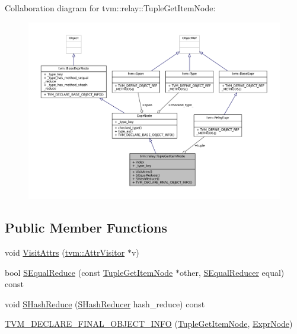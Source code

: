 Collaboration diagram for tvm\+:\+:relay\+:\+:Tuple\+Get\+Item\+Node\+:
\nopagebreak
\begin{figure}[H]
\begin{center}
\leavevmode
\includegraphics[width=350pt]{classtvm_1_1relay_1_1TupleGetItemNode__coll__graph}
\end{center}
\end{figure}
\subsection*{Public Member Functions}
\begin{DoxyCompactItemize}
\item 
void \hyperlink{classtvm_1_1relay_1_1TupleGetItemNode_afd099ce2c3f60fe39b4fe4094c77c58e}{Visit\+Attrs} (\hyperlink{classtvm_1_1AttrVisitor}{tvm\+::\+Attr\+Visitor} $\ast$v)
\item 
bool \hyperlink{classtvm_1_1relay_1_1TupleGetItemNode_af2eb9ea57fbd17efe0e049ca8fe0eabf}{S\+Equal\+Reduce} (const \hyperlink{classtvm_1_1relay_1_1TupleGetItemNode}{Tuple\+Get\+Item\+Node} $\ast$other, \hyperlink{classtvm_1_1SEqualReducer}{S\+Equal\+Reducer} equal) const 
\item 
void \hyperlink{classtvm_1_1relay_1_1TupleGetItemNode_a9fa97b42d0ed9c1240e5991085989b77}{S\+Hash\+Reduce} (\hyperlink{classtvm_1_1SHashReducer}{S\+Hash\+Reducer} hash\+\_\+reduce) const 
\item 
\hyperlink{classtvm_1_1relay_1_1TupleGetItemNode_afd954007bba1505fe402a806817a4499}{T\+V\+M\+\_\+\+D\+E\+C\+L\+A\+R\+E\+\_\+\+F\+I\+N\+A\+L\+\_\+\+O\+B\+J\+E\+C\+T\+\_\+\+I\+N\+FO} (\hyperlink{classtvm_1_1relay_1_1TupleGetItemNode}{Tuple\+Get\+Item\+Node}, \hyperlink{namespacetvm_1_1relay_a387f18e050d016c52ea6c4781e7cff6c}{Expr\+Node})
\end{DoxyCompactItemize}
